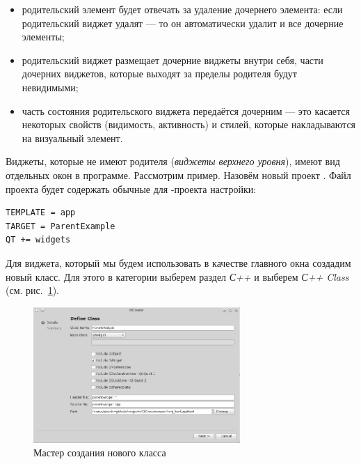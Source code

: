 \begin{itemize}
\item родительский элемент будет отвечать за удаление дочернего элемента: если родительский
виджет удалят --- то он автоматически удалит и все дочерние элементы;
\item родительский виджет размещает дочерние виджеты внутри себя, части дочерних виджетов, которые выходят  за пределы
родителя будут невидимыми;
\item часть состояния родительского виджета передаётся дочерним --- это касается некоторых свойств (видимость, активность)
и стилей, которые накладываются на визуальный элемент.
\end{itemize}

Виджеты, которые не имеют родителя (\emph{виджеты верхнего уровня}), имеют вид
отдельных окон в программе. Рассмотрим пример. Назовём новый проект . Файл проекта будет
содержать обычные для -проекта настройки:
\begin{lstlisting}
TEMPLATE = app
TARGET = ParentExample
QT += widgets
\end{lstlisting}

Для виджета, который мы будем использовать в качестве главного окна создадим новый класс.
Для этого в категории  выберем раздел \emph{С++} и
выберем \emph{С++ Class} (см. рис.~\ref{ch13:refDrawing1}).

\begin{figure}[htb]
\begin{center}
\includegraphics[width=0.7\textwidth]{img/ris_13_2}
\caption{Мастер создания нового класса}
\label{ch13:refDrawing1}
\end{center}
\end{figure}

